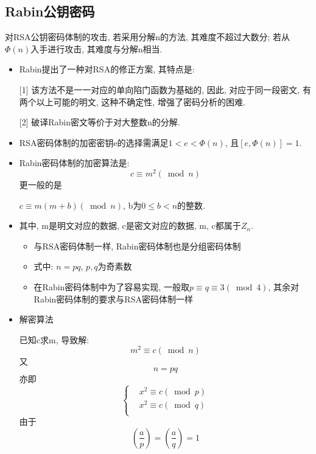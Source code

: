 \documentclass[UTF8]{ctexart}
\begin{document}
    \subsection{Rabin公钥密码}
    对RSA公钥密码体制的攻击, 若采用分解n的方法, 其难度不超过大数分; 若从$\Phi(n)$入手进行攻击, 其难度与分解n相当.
    \begin{itemize}
        \item Rabin提出了一种对RSA的修正方案, 其特点是:

        [1] 该方法不是一一对应的单向陷门函数为基础的, 因此, 对应于同一段密文, 有两个以上可能的明文, 这种不确定性, 增强了密码分析的困难.

        [2] 破译Rabin密文等价于对大整数n的分解.

        \item RSA密码体制的加密密钥e的选择需满足$1<e<\Phi(n)$, 且$[e, \Phi(n)]=1$.
        \item Rabin密码体制的加密算法是:
        $$c\equiv m^2(\bmod n)$$
        更一般的是

        $c\equiv m(m+b)(\bmod n)$, b为$0\le b<n$的整数.

        \item 其中, m是明文对应的数据, c是密文对应的数据, m, c都属于$Z_n$.
        \begin{itemize}
            \item 与RSA密码体制一样, Rabin密码体制也是分组密码体制
            \item 式中: $n=pq$, $p,q$为奇素数
            \item 在Rabin密码体制中为了容易实现, 一般取$p\equiv q\equiv 3(\bmod 4)$, 其余对Rabin密码体制的要求与RSA密码体制一样
        \end{itemize}

        \item 解密算法

        已知c求m, 导致解:
        $$m^2\equiv c(\bmod n)$$
        又
        $$n=pq$$
        亦即
        $$
        \left\{ \begin{aligned}
            &x^2\equiv c(\bmod p)\\
            &x^2\equiv c(\bmod q)\\
        \end{aligned}\right.
        $$
        由于
        $$(\frac{a}{p})=(\frac{a}{q})=1$$


\end{itemize}
\end{document}
